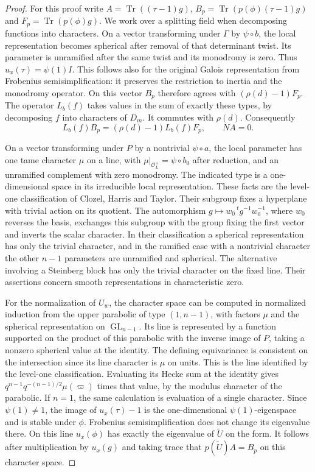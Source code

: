 \documentclass[a4paper,11pt]{article}
\theoremstyle{definition}
\theoremstyle{remark}
\numberwithin{equation}{section}
\newcommand{\GL}{\operatorname{GL}}
\begin{document}
\begin{proof}
For this proof write \(A=\operatorname{Tr}((\tau-1)g)\),
\(B_p=\operatorname{Tr}(p(\phi)(\tau-1)g)\) and
\(F_p=\operatorname{Tr}(p(\phi)g)\). We work over a splitting
field when decomposing functions into characters. On a vector
transforming under \(\Gamma\) by \(\psi\circ b\), the local
representation becomes spherical after removal of that
determinant twist. Its parameter is unramified after the same
twist and its monodromy is zero. Thus \(u_x(\tau)=\psi(1)I\).
This follows also for the original Galois representation from
Frobenius semisimplification: it preserves the restriction to
inertia and the monodromy operator. On this vector \(B_p\)
therefore agrees with \((\rho(d)-1)F_p\).
The operator \(L_b(f)\) takes values in the sum of exactly
these types, by decomposing \(f\) into characters of \(D_m\).
It commutes with \(\rho(d)\). Consequently
\[
        L_b(f)B_p=(\rho(d)-1)L_b(f)F_p,\qquad NA=0.
\]

On a vector transforming under \(P\) by a nontrivial
\(\psi\circ a\), the local parameter has one tame character
\(\mu\) on a line, with \(\mu|_{\mathcal O_L^\times}=\psi
\circ b_0\) after reduction, and an unramified complement with
zero monodromy. The indicated type is a one-dimensional space
in its irreducible local representation. These facts are the
level-one classification of Clozel, Harris and Taylor.
Their subgroup fixes a hyperplane with trivial action on its
quotient. The automorphism \(g\mapsto w_0\,{}^t g^{-1} w_0^{-1}\),
where \(w_0\) reverses the basis, exchanges this subgroup with
the group fixing the first vector and inverts the scalar
character. In their classification a spherical representation
has only the trivial character, and in the ramified case with
a nontrivial character the other \(n-1\) parameters are
unramified and spherical. The alternative involving a
Steinberg block has only the trivial character on the fixed line.
Their assertions concern smooth representations in characteristic
zero.~\cite[Lemmas 3.1.3 and 3.1.5]{IX-VII-VII-chttransfer721}

For the normalization of \(U_w\), the character space can be
computed in normalized induction from the upper parabolic of
type \((1,n-1)\), with factors \(\mu\) and the spherical
representation on \(\GL_{n-1}\). Its line is represented by a
function supported on the product of this parabolic with the
inverse image of \(P\), taking a nonzero spherical value at
the identity. The defining equivariance is consistent on the
intersection since its line character is \(\mu\) on units.
This is the line identified by the level-one classification.
Evaluating its Hecke sum at the identity gives
\(q^{n-1}q^{-(n-1)/2}\mu(\varpi)\) times that value, by
the modulus character of the parabolic. If \(n=1\), the same
calculation is evaluation of a single character.
Since \(\psi(1)\ne1\), the image of \(u_x(\tau)-1\) is the
one-dimensional \(\psi(1)\)-eigenspace and is stable under
\(\phi\). Frobenius semisimplification does not change its
eigenvalue there. On this line \(u_x(\phi)\) has exactly the
eigenvalue of \(\widetilde U\) on the form.
It follows after multiplication by \(u_x(g)\) and taking trace
that \(p(\widetilde U)A=B_p\) on this character space.


\end{proof}
\end{document}
